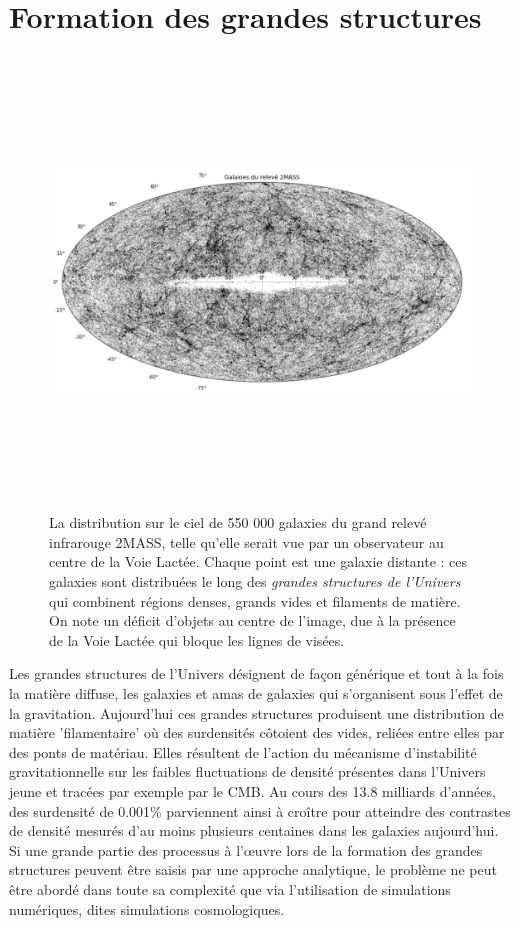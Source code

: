 
\chapter{Formation des grandes structures}
\label{s:struct}
\begin{figure}[htbp]
	\centering
		\includegraphics[height=12cm]{figs/2MASSLSS.png}
		\caption[Le relevé de galaxies 2MASS]{La distribution sur le ciel de 550 000 galaxies du grand relevé infrarouge 2MASS, telle qu'elle serait vue par un observateur au centre de la Voie Lactée. Chaque point est une galaxie distante : ces galaxies sont distribuées le long des \textit{grandes structures de l'Univers} qui combinent régions denses, grands vides et filaments de matière. On note un déficit d'objets au centre de l'image, due à la présence de la Voie Lactée qui bloque les lignes de visées.}
	\label{f:2MASS}
\end{figure}

Les grandes structures de l'Univers désignent de façon générique et tout à la fois la matière diffuse, les galaxies et amas de galaxies qui s'organisent sous l'effet de la gravitation. Aujourd'hui ces grandes structures produisent une distribution de matière 'filamentaire' où des surdensités côtoient des vides, reliées entre elles par des ponts de matériau. Elles résultent de l'action du mécanisme d'instabilité gravitationnelle sur les faibles fluctuations de densité présentes dans l'Univers jeune et tracées par exemple par le CMB. Au cours des 13.8 milliards d'années, des surdensité de 0.001\% parviennent ainsi à croître pour atteindre des contrastes de densité mesurés d'au moins plusieurs centaines dans les galaxies aujourd'hui. Si une grande partie des processus à l'œuvre lors de la formation des grandes structures peuvent être saisis par une approche analytique, le problème ne peut être abordé dans toute sa complexité que via l'utilisation de simulations numériques, dites simulations cosmologiques.



